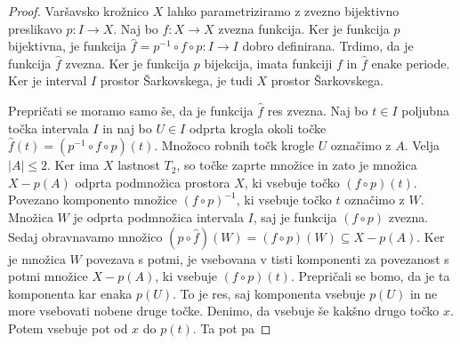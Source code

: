 \documentclass[mat2]{fmfdelo}
\begin{document}
\begin{proof}
Varšavsko krožnico $X$ lahko parametriziramo z zvezno bijektivno preslikavo $p:I \to X$. Naj bo $f: X \to X$ zvezna funkcija. Ker je funkcija $p$ bijektivna, je funkcija $\widehat{f} = p^{-1} \circ f \circ p : I \to I$ dobro definirana. Trdimo, da je funkcija $\widehat{f}$ zvezna. Ker je funkcija $p$ bijekcija, imata funkciji $f$ in $\widehat{f}$ enake periode. Ker je interval $I$ prostor Šarkovskega, je tudi $X$ prostor Šarkovskega. 

Prepričati se moramo samo še, da je funkcija $\widehat{f}$ res zvezna. Naj bo $t \in I$ poljubna točka intervala $I$ in naj bo $U \in I$ odprta krogla okoli točke $\widehat{f}(t) = (p^{-1} \circ f \circ p)(t)$. Množoco robnih točk krogle $U$ označimo z $A$. Velja $|A| \leq 2$. Ker ima $X$ lastnost $T_2$, so točke zaprte množice in zato je množica $X - p(A)$ odprta podmnožica prostora $X$, ki vsebuje točko $(f \circ p)(t)$. Povezano komponento množice $(f \circ p)^{-1}$, ki vsebuje točko $t$ označimo z $W$. Množica $W$ je odprta podmnožica intervala $I$, saj je funkcija $(f \circ p)$ zvezna. Sedaj obravnavamo množico $\left(p \circ \widehat{f}\right) (W) = (f \circ p)(W) \subseteq X - p(A)$. Ker je množica $W$ povezava s potmi, je vsebovana v tisti komponenti za povezanost s potmi množice $X-p(A)$, ki vsebuje $(f \circ p)(t)$. 
Prepričali se bomo, da je ta komponenta kar enaka $p(U)$. To je res, saj komponenta vsebuje $p(U)$ in ne more vsebovati nobene druge točke. Denimo, da vsebuje še kakšno drugo točko $x$. Potem vsebuje pot od $x$ do $p(t)$. Ta pot pa  
\end{proof}



\end{document}

